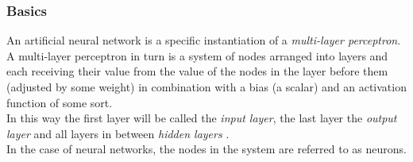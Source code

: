 \begin{multicols}{2}
\subsubsection{Basics}
An artificial neural network is a specific instantiation of a \textit{multi-layer perceptron}.
A multi-layer perceptron in turn is a system of nodes arranged into layers and each receiving their value from the value of the nodes in the layer before them (adjusted by some weight) in combination with a bias (a scalar) and an activation function of some sort. \\
In this way the first layer will be called the \textit{input layer}, the last layer the \textit{output layer} and all layers in between \textit{hidden layers} \citep[p. 227]{bishop-2006}. \\
In the case of neural networks, the nodes in the system are referred to as neurons.


\end{multicols}
